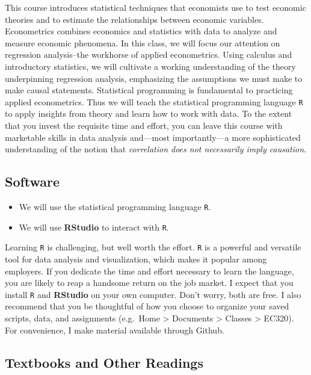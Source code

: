 \documentclass[
  letterpaper,
  DIV=11,
  numbers=noendperiod]{scrartcl}
\providecommand{\tightlist}{%
  \setlength{\itemsep}{0pt}\setlength{\parskip}{0pt}}\usepackage{longtable,booktabs,array}
\begin{document}
This course introduces statistical techniques that economists use to
test economic theories and to estimate the relationships between
economic variables. Econometrics combines economics and statistics with
data to analyze and measure economic phenomena. In this class, we will
focus our attention on regression analysis--the workhorse of applied
econometrics. Using calculus and introductory statistics, we will
cultivate a working understanding of the theory underpinning regression
analysis, emphasizing the assumptions we must make to make causal
statements. Statistical programming is fundamental to practicing applied
econometrics. Thus we will teach the statistical programming language
\texttt{R} to apply insights from theory and learn how to work with
data. To the extent that you invest the requisite time and effort, you
can leave this course with marketable skills in data analysis and---most
importantly---a more sophisticated understanding of the notion that
\emph{correlation does not necessarily imply causation}.

\subsection{Software}\label{software}

\begin{itemize}
\tightlist
\item
  We will use the statistical programming language \texttt{R}.
\item
  We will use \textbf{RStudio} to interact with \texttt{R}.
\end{itemize}

Learning \texttt{R} is challenging, but well worth the effort.
\texttt{R} is a powerful and versatile tool for data analysis and
visualization, which makes it popular among employers. If you dedicate
the time and effort necessary to learn the language, you are likely to
reap a handsome return on the job market. I expect that you install
\texttt{R} and \textbf{RStudio} on your own computer. Don't worry, both
are free. I also recommend that you be thoughtful of how you choose to
organize your saved scripts, data, and assignments (e.g.~Home
\textgreater{} Documents \textgreater{} Classes \textgreater{} EC320).
For convenience, I make material available through Github.

\subsection{Textbooks and Other
Readings}\label{textbooks-and-other-readings}
\end{document}
